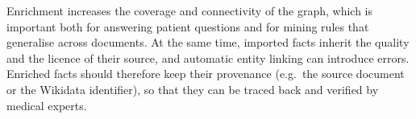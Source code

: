 Enrichment increases the coverage and connectivity of the graph, which is
important both for answering patient questions and for mining rules that
generalise across documents. At the same time, imported facts inherit the
quality and the licence of their source, and automatic entity linking can
introduce errors. Enriched facts should therefore keep their provenance
(e.g.\ the source document or the Wikidata identifier), so that they can be
traced back and verified by medical experts.

